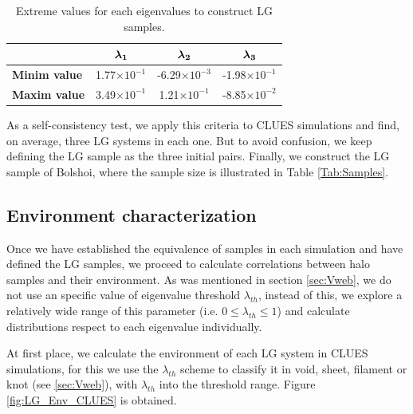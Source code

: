 \documentclass[usenatbib]{mn2e}
\begin{document}
\begin{table}
  \centering
  \begin{tabular}{l | c c c} \hline
	& $\boldsymbol{ \lambda_{1} }$ & $\boldsymbol{ \lambda_{2} }$  & $\boldsymbol{ \lambda_{3} }$ \\ \hline
	\textbf{Minim value} & 1.77$\times 10^{-1}$ & -6.29$\times 10^{-3}$ & -1.98$\times 10^{-1}$ \\
	\textbf{Maxim value} & 3.49$\times 10^{-1}$ & 1.21$\times 10^{-1}$ & -8.85$\times 10^{-2}$ \\ \hline
  \end{tabular}
  
  \caption{Extreme values for each eigenvalues to construct LG samples.}
  
  \label{Tab:Lambdas_LG}
\end{table}


As a self-consistency test, we apply this criteria to CLUES simulations 
and find, on average, three LG systems in each one. But to avoid confusion, 
we keep defining the LG sample as the three initial pairs. Finally, we 
construct the LG sample of Bolshoi, where the sample size is illustrated 
in Table \ref{Tab:Samples}.


\subsection{Environment characterization}
\label{subsec:Env_characterization}


Once we have established the equivalence of samples in each simulation and 
have defined the LG samples, we proceed to calculate correlations between 
halo samples and their environment. As was mentioned in section 
\ref{sec:Vweb}, we do not use an specific value of eigenvalue threshold 
$\lambda_{th}$, instead of this, we explore a relatively wide range of 
this parameter (i.e. $0 \leq \lambda_{th} \leq 1$) and calculate 
distributions respect to each eigenvalue individually.


At first place, we calculate the environment of each LG system in CLUES 
simulations, for this we use the $\lambda_{th}$ scheme to classify it in 
void, sheet, filament or knot (see \ref{sec:Vweb}), with $\lambda_{th}$
into the threshold range. Figure \ref{fig:LG_Env_CLUES} is obtained.
\end{document}
